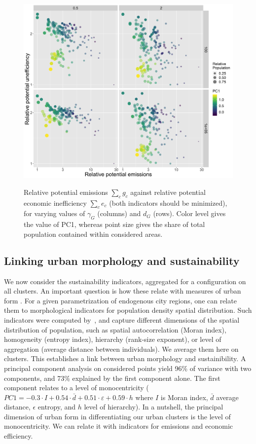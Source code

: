\documentclass{jimis-en}
\begin{document}
\begin{figure}[!ht] 
  {\includegraphics[width=\linewidth]{Fig7.png}}
  \centering  
  \caption{Relative potential emissions $\sum_c g_c$ against relative potential economic inefficiency $\sum_c e_c$ (both indicators should be minimized), for varying values of $\gamma_G$ (columns) and $d_G$ (rows). Color level gives the value of PC1, whereas point size gives the share of total population contained within considered areas.\label{fig:paretos-relative}}
\end{figure}


\subsection{Linking urban morphology and sustainability}


We now consider the sustainability indicators, aggregated for a configuration on all clusters. An important question is how these relate with measures of urban form \citep{le2012urban}. For a given parametrization of endogenous city regions, one can relate them to morphological indicators for population density spatial distribution. Such indicators were computed by~\cite{raimbault2018calibration}, and capture different dimensions of the spatial distribution of population, such as spatial autocorrelation (Moran index), homogeneity (entropy index), hierarchy (rank-size exponent), or level of aggregation (average distance between individuals). We average them here on clusters. This establishes a link between urban morphology and sustainibility. A principal component analysis on considered points yield 96\% of variance with two components, and 73\% explained by the first component alone. The first component relates to a level of monocentricity ($PC1 = -0.3\cdot I + 0.54 \cdot \bar{d} + 0.51\cdot \varepsilon + 0.59 \cdot h$ where $I$ is Moran index, $\bar{d}$ average distance, $\epsilon$ entropy, and $h$ level of hierarchy). In a nutshell, the principal dimension of urban form in differentiating our urban clusters is the level of monocentricity. We can relate it with indicators for emissions and economic efficiency.
\end{document}
